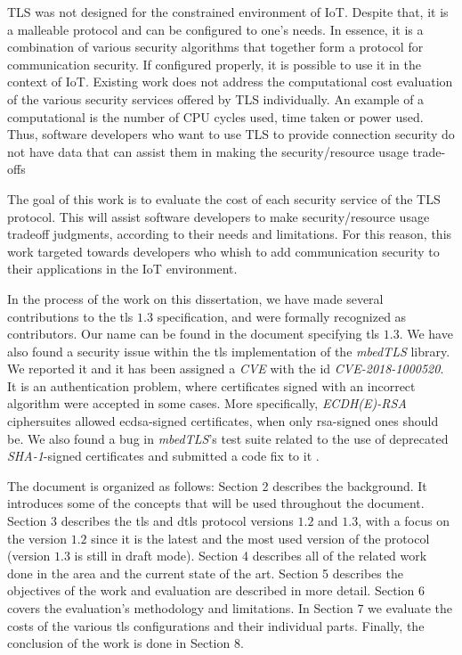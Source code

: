 \documentclass{llncs}
\begin{document}
TLS was not designed for the constrained environment of IoT. Despite that,
it is a malleable protocol and can be configured to one's needs. In essence,
it is a combination of various security algorithms that together form
a protocol for communication security. If configured
properly, it is possible to use it in the context of IoT. Existing work
does not address the computational cost evaluation of the various security services
offered by TLS individually. An example of a computational is the number of CPU
cycles used, time taken or power used. Thus, software developers
who want to use TLS to provide connection security do not have data that can
assist them in making the security/resource usage trade-offs

The goal of this work is to evaluate the cost of each security service of the
TLS protocol. This will assist software developers to make security/resource usage
tradeoff judgments, according to their needs and limitations. For this reason,
this work targeted towards developers who whish to add communication security
to their applications in the IoT environment.

In the process of the work on this dissertation, we have made several
contributions to the \gls{tls} $1.3$ specification, and were formally recognized as 
contributors\cite{Mergepul65:online}. Our name can be found in the document specifying \gls{tls} $1.3$\cite{RFC8446}.
We have also found a security issue within the
\gls{tls} implementation of the \textit{mbedTLS} library. We reported it and it
has been assigned a \textit{CVE} with the id \textit{CVE-2018-1000520}\cite{NVDCVE2094:online}.
It is an authentication problem, where certificates signed with an incorrect algorithm
were accepted in some cases. More specifically, \textit{ECDH(E)-RSA} ciphersuites allowed \gls{ecdsa}-signed
certificates, when only \gls{rsa}-signed ones should be. We also found a bug in \textit{mbedTLS}'s test suite
related to the use of deprecated \textit{SHA-1}-signed certificates and submitted a code fix to 
it \cite{sslserve89:onelin}\cite{updatete23:online}.

The document is organized as follows: Section 2 describes the background. It
introduces some of the concepts that will be used throughout
the document. Section 3 describes the \gls{tls} and \gls{dtls} protocol
versions $1.2$ and $1.3$, with a focus on the version $1.2$ since
it is the latest and the most used version of the protocol (version $1.3$ is still in
draft mode). Section 4 describes all of the related work done in the area and
the current state of the art. Section 5 describes the objectives of the work and evaluation 
are described in more detail. 
Section 6
covers the evaluation's methodology and limitations. In Section 7 we evaluate the costs of the various \gls{tls}
configurations and their individual parts. Finally, the conclusion of the work is done in Section 8.
\end{document}
